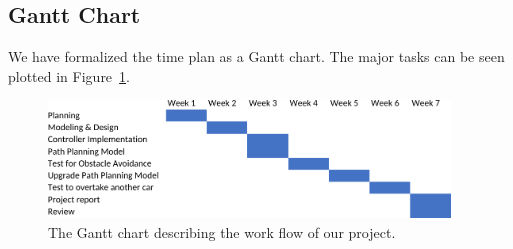 \documentclass{article}
\begin{document}
\subsection{Gantt Chart}
    We have formalized the time plan as a Gantt chart. The major tasks can be seen plotted in Figure~\ref{fig:gantt}.
    \begin{figure} [ht]
        \centering
        \includegraphics[width=0.95\textwidth]{figures/timePlan}
        \caption{The Gantt chart describing the work flow of our project.}
        \label{fig:gantt}
    \end{figure}
\end{document}
